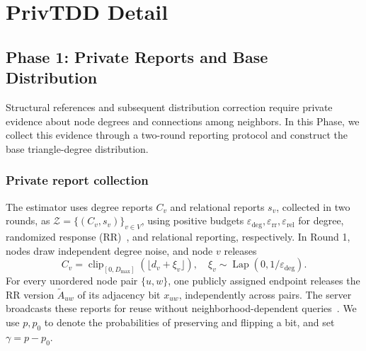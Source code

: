 \section{PrivTDD Detail}

\subsection{Phase 1: Private Reports and Base Distribution}
\label{sec:base}
\label{sec:private_collection}
\label{sec:distribution_construction}
Structural references and subsequent distribution correction require private evidence about node degrees and connections among neighbors.
In this Phase, we collect this evidence through a two-round reporting protocol and construct the base triangle-degree distribution.

\subsubsection{Private report collection}
The estimator uses degree reports $C_v$ and relational reports $s_v$, collected in two rounds, as $\mathcal Z=\{(C_v,s_v)\}_{v\in V}$, using positive budgets $\varepsilon_{\mathrm{deg}},\varepsilon_{\mathrm{rr}},\varepsilon_{\mathrm{rel}}$ for degree, randomized response (RR)~\cite{LDPGDDWarner1965}, and relational reporting, respectively.
In Round 1, nodes draw independent degree noise, and node $v$ releases
\begin{equation}
C_v=\operatorname{clip}_{[0,D_{\max}]}\!\left(\lfloor d_v+\xi_v\rfloor\right),
\quad \xi_v\sim\operatorname{Lap}(0,1/\varepsilon_{\mathrm{deg}}).
\label{eq:private_degree}
\end{equation}
For every unordered node pair $\{u,w\}$, one publicly assigned endpoint releases the RR version $\widetilde A_{uw}$ of its adjacency bit $x_{uw}$, independently across pairs. The server broadcasts these reports for reuse without neighborhood-dependent queries~\cite{imola2021locally}. 
We use $p,p_0$ to denote the probabilities of preserving
and flipping a bit, and set $\gamma=p-p_0$.

